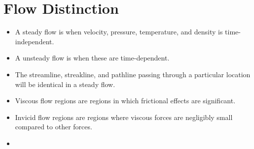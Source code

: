 \documentclass[a4paper]{article}
\numberwithin{equation}{section}
\begin{document}
\section{Flow Distinction}
\begin{itemize}
    \item A steady flow is when velocity, pressure, temperature, and density is time-independent.
    \item A unsteady flow is when these are time-dependent.
    \item The streamline, streakline, and pathline passing through a particular location will be identical in a steady flow.
    \item Viscous flow regions are regions in which frictional effects are significant.
    \item Invicid flow regions are regions where viscous forces are negligibly small compared to other forces.
    \item 
\end{itemize}
\end{document}
